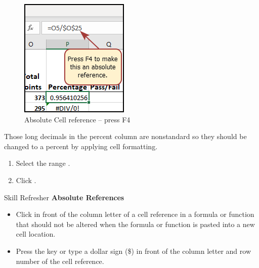 \begin{figure}[H]
	\centering
	\includegraphics[width=\maxwidth{.40\linewidth}]{gfx/ch03_fig08}
	\caption{Absolute Cell reference – press F4}
	\label{03:fig08}
\end{figure}

Those long decimals in the percent column are nonstandard so they should be changed to a percent by applying cell formatting.

\begin{enumerate}
	\item Select the range .
	\item Click .
\end{enumerate}

\begin{center}
	\begin{sklbox}{Skill Refresher}
		\textbf{Absolute References}
		\\
		\begin{itemize}
			\setlength{\itemsep}{0pt}
			\setlength{\parskip}{0pt}
			\setlength{\parsep}{0pt}

			\item Click in front of the column letter of a cell reference in a formula or function that should not be altered when the formula or function is pasted into a new cell location.
			\item Press the  key or type a dollar sign (\$) in front of the column letter and row number of the cell reference.
						
		\end{itemize}
	\end{sklbox}
\end{center}

